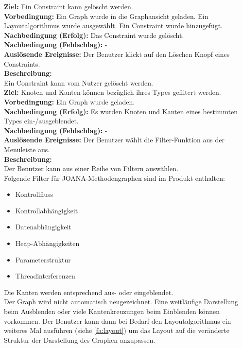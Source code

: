 \label{fa:deleteconstraint}
\textbf{Ziel:} Ein Constraint kann gelöscht werden. \\
\textbf{Vorbedingung:} Ein Graph wurde in die Graphansicht geladen. Ein Layoutalgorithmus wurde ausgewählt. Ein Constraint wurde hinzugefügt. \\
\textbf{Nachbedingung (Erfolg):} Das Constraint wurde gelöscht. \\
\textbf{Nachbedingung (Fehlschlag):} - \\
\textbf{Auslösende Ereignisse:} Der Benutzer klickt auf den Löschen Knopf eines Constraints. \\
\textbf{Beschreibung:}\\
Ein Constraint kann vom Nutzer gelöscht werden.\\

\label{fa:filter}
\textbf{Ziel:} Knoten und Kanten können bezüglich ihres Types gefiltert werden.\\
\textbf{Vorbedingung:} Ein Graph wurde geladen.\\
\textbf{Nachbedingung (Erfolg):} Es wurden Knoten und Kanten eines bestimmten Types ein-/ausgeblendet.\\
\textbf{Nachbedingung (Fehlschlag):} -\\
\textbf{Auslösende Ereignisse:}
Der Benutzer wählt die Filter-Funktion aus der Menüleiste aus.\\
\textbf{Beschreibung:}\\
Der Benutzer kann aus einer Reihe von Filtern auswählen.\\
Folgende Filter für JOANA-Methodengraphen sind im Produkt enthalten:
\begin{itemize}[nolistsep]
  \item Kontrollfluss
  \item Kontrollabhängigkeit
  \item Datenabhängigkeit
  \item Heap-Abhängigkeiten
  \item Parameterstruktur
  \item Threadinterferenzen
\end{itemize}
Die Kanten werden entsprechend aus- oder eingeblendet.\\
Der Graph wird nicht automatisch neugezeichnet. Eine weitläufige Darstellung beim Ausblenden oder viele Kantenkreuzungen beim Einblenden können vorkommen.
Der Benutzer kann dann bei Bedarf den Layoutalgorithmus ein weiteres Mal ausführen (siehe \ref{fa:layout}) um das Layout auf die
veränderte Struktur der Darstellung des Graphen anzupassen.\\

